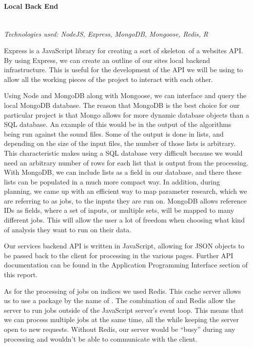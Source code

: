 \paragraph{Local Back End} \mbox{}\\
\textit{Technologies used: NodeJS, Express, MongoDB, Mongoose, Redis, R}\par
Express is a JavaScript library for creating a sort of \textquotesingle skeleton\textquotesingle\ of a website\textquotesingle s API. By using Express, we can create an outline of our site\textquotesingle s local backend infrastructure. This is useful for the development of the API we will be using to allow all the working pieces of the project to interact with each other.\par
Using Node and MongoDB along with Mongoose, we can interface and query the local MongoDB database. The reason that MongoDB is the best choice for our particular project is that Mongo allows for more dynamic database objects than a SQL database. An example of this would be in the output of the algorithms being run against the sound files. Some of the output is done in lists, and depending on the size of the input files, the number of those lists is arbitrary. This characteristic makes using a SQL database very difficult because we would need an arbitrary number of rows for each list that is output from the processing. With MongoDB, we can include lists as a field in our database, and there these lists can be populated in a much more compact way. In addition, during planning, we came up with an efficient way to map parameter research, which we are referring to as jobs, to the inputs they are run on. MongoDB allows reference IDs as fields, where a set of inputs, or multiple sets, will be mapped to many different jobs. This will allow the user a lot of freedom when choosing what kind of analysis they want to run on their data.\par
Our service\textquotesingle s backend API is written in JavaScript, allowing for JSON objects to be passed back to the client for processing in the various pages. Further API documentation can be found in the Application Programming Interface section of this report.\par
As for the processing of jobs on indices we used Redis. This cache server allows us to use a package by the name of . The combination of  and Redis allow the server to run jobs outside of the JavaScript server's event loop. This means that we can process multiple jobs at the same time, all the while keeping the server open to new requests. Without Redis, our server would be ``busy'' during any processing and wouldn't be able to communicate with the client.\par
